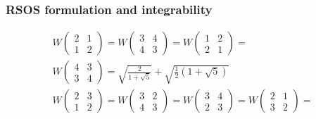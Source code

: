 \documentclass[pdftex]{beamer}
\theoremstyle{definition} \newtheorem{Def}{Definition}
\begin{document}
\begin{frame}
  \frametitle{ RSOS formulation and integrability}
   \begin{equation}
     \label{eq:12}
     \begin{array}{l}
       W\left(                                          
         \begin{array}{cc}
           2 & 1 \\
           1 & 2
         \end{array}
       \right)=
       W\left(
         \begin{array}{cc}
           3 & 4 \\
           4 & 3
         \end{array}
       \right)=   W\left(                                         
         \begin{array}{cc}
           1 & 2 \\
           2 & 1
         \end{array}
       \right)= \\
       W\left(                                                  
         \begin{array}{cc}
           4 & 3 \\
           3 & 4
         \end{array}
       \right)=\sqrt{\frac{2}{1+\sqrt{5}}}+\sqrt{\frac{1}{2}\left(1+\sqrt{5}\right)}\\
 W\left(                                      
           \begin{array}{cc}
             2 & 3 \\
             1 & 2
           \end{array}
         \right)=
         W\left(                                         
           \begin{array}{cc}
             3 & 2 \\
             4 & 3
           \end{array}
         \right)=    W\left(                                         
           \begin{array}{cc}
             3 & 4 \\
             2 & 3
           \end{array}
         \right)=    W\left(                                         
           \begin{array}{cc}
             2 & 1 \\
             3 & 2
           \end{array}
         \right)=\\

\end{array}
\end{equation}
\end{frame}
\end{document}
